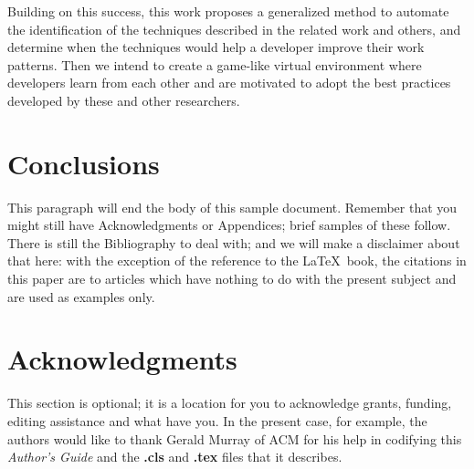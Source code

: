 \documentclass{sig-alternate}
\begin{document}
Building on this success, this work proposes a generalized method to automate the identification of the techniques described in the related work and others, and determine when the techniques would help a developer improve their work patterns.  Then we intend to create a game-like virtual environment where developers learn from each other and are motivated to adopt the best practices developed by these and other researchers.

\section{Conclusions}
This paragraph will end the body of this sample document.
Remember that you might still have Acknowledgments or
Appendices; brief samples of these
follow.  There is still the Bibliography to deal with; and
we will make a disclaimer about that here: with the exception
of the reference to the \LaTeX\ book, the citations in
this paper are to articles which have nothing to
do with the present subject and are used as
examples only.

\section{Acknowledgments}
This section is optional; it is a location for you
to acknowledge grants, funding, editing assistance and
what have you.  In the present case, for example, the
authors would like to thank Gerald Murray of ACM for
his help in codifying this \textit{Author's Guide}
and the \textbf{.cls} and \textbf{.tex} files that it describes.

%

\balance
 
%
%
\end{document}
